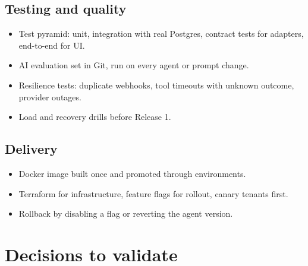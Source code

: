 \subsection{Testing and quality}

\begin{itemize}
\item Test pyramid: unit, integration with real Postgres, contract tests for adapters, end-to-end for UI.
\item AI evaluation set in Git, run on every agent or prompt change.
\item Resilience tests: duplicate webhooks, tool timeouts with unknown outcome, provider outages.
\item Load and recovery drills before Release 1.
\end{itemize}
\subsection{Delivery}

\begin{itemize}
\item Docker image built once and promoted through environments.
\item Terraform for infrastructure, feature flags for rollout, canary tenants first.
\item Rollback by disabling a flag or reverting the agent version.
\end{itemize}
\section{Decisions to validate}

